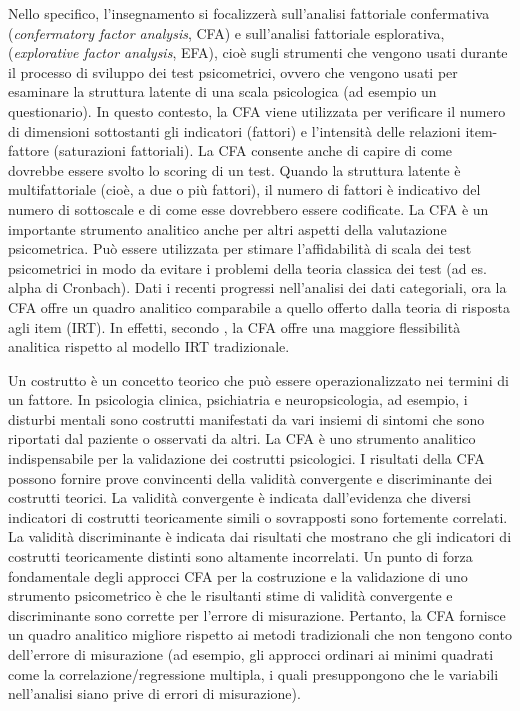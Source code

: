 \documentclass[
  11pt,
]{krantz}
\theoremstyle{definition}
\theoremstyle{definition}
\theoremstyle{definition}
\theoremstyle{definition}
\theoremstyle{remark}
\begin{document}
Nello specifico, l'insegnamento si focalizzerà sull'analisi fattoriale confermativa (\emph{confermatory factor analysis}, CFA) e sull'analisi fattoriale esplorativa, (\emph{explorative factor analysis}, EFA), cioè sugli strumenti che vengono usati durante il processo di sviluppo dei test psicometrici, ovvero che vengono usati per esaminare la struttura latente di una scala psicologica (ad esempio un questionario). In questo contesto, la CFA viene utilizzata per verificare il numero di dimensioni sottostanti gli indicatori (fattori) e l'intensità delle relazioni item-fattore (saturazioni fattoriali). La CFA consente anche di capire di come dovrebbe essere svolto lo scoring di un test. Quando la struttura latente è multifattoriale (cioè, a due o più fattori), il numero di fattori è indicativo del numero di sottoscale e di come esse dovrebbero essere codificate. La CFA è un importante strumento analitico anche per altri aspetti della valutazione psicometrica. Può essere utilizzata per stimare l'affidabilità di scala dei test psicometrici in modo da evitare i problemi della teoria classica dei test (ad es. alpha di Cronbach). Dati i recenti progressi nell'analisi dei dati categoriali, ora la CFA offre un quadro analitico comparabile a quello offerto dalla teoria di risposta agli item (IRT). In effetti, secondo \citet{brown2015confirmatory}, la CFA offre una maggiore flessibilità analitica rispetto al modello IRT tradizionale.

Un costrutto è un concetto teorico che può essere operazionalizzato nei termini di un fattore. In psicologia clinica, psichiatria e neuropsicologia, ad esempio, i disturbi mentali sono costrutti manifestati da vari insiemi di sintomi che sono riportati dal paziente o osservati da altri. La CFA è uno strumento analitico indispensabile per la validazione dei costrutti psicologici. I risultati della CFA possono fornire prove convincenti della validità convergente e discriminante dei costrutti teorici. La validità convergente è indicata dall'evidenza che diversi indicatori di costrutti teoricamente simili o sovrapposti sono fortemente correlati. La validità discriminante è indicata dai risultati che mostrano che gli indicatori di costrutti teoricamente distinti sono altamente incorrelati. Un punto di forza fondamentale degli approcci CFA per la costruzione e la validazione di uno strumento psicometrico è che le risultanti stime di validità convergente e discriminante sono corrette per l'errore di misurazione. Pertanto, la CFA fornisce un quadro analitico migliore rispetto ai metodi tradizionali che non tengono conto dell'errore di misurazione (ad esempio, gli approcci ordinari ai minimi quadrati come la correlazione/regressione multipla, i quali presuppongono che le variabili nell'analisi siano prive di errori di misurazione).
\end{document}
